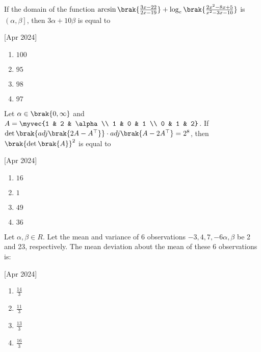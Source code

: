     \item If the domain of the function $\arcsin\brak{\frac{3x-22}{2x-19}}+\log_e\brak{\frac{2x^2-8x+5}{x^2-3x-10}}$ is $\left(\alpha,\beta\right]$, then $3\alpha+10\beta$ is equal to
    
    \hfill[Apr 2024]

        \begin{multicols}{4}
            \begin{enumerate}
                \item $100$
                \item $95$
                \item $98$
                \item $97$
            \end{enumerate}
        \end{multicols}

    \item Let $\alpha\in\brak{0,\infty}$ and $A=\myvec{1 & 2 & \alpha \\ 1 & 0 & 1 \\ 0 & 1 & 2}$. If $\det\brak{adj\brak{2A-A^\top}}\cdot adj\brak{A-2A^\top}=2^8$, then $\brak{\det\brak{A}}^2$ is equal to
    
    \hfill[Apr 2024]

        \begin{multicols}{4}
            \begin{enumerate}
                \item $16$
                \item $1$
                \item $49$
                \item $36$
            \end{enumerate}
        \end{multicols}
        
    \item Let $\alpha,\beta\in R$. Let the mean and variance of 6 observations $-3,4,7,-6\alpha,\beta$ be 2 and 23, respectively. The mean deviation about the mean of these 6 observations is:
    
    \hfill[Apr 2024]

        \begin{multicols}{4}
            \begin{enumerate}
                \item $\frac{14}{3}$
                \item $\frac{11}{3}$
                \item $\frac{13}{3}$
                \item $\frac{16}{3}$
            \end{enumerate}
        \end{multicols}

